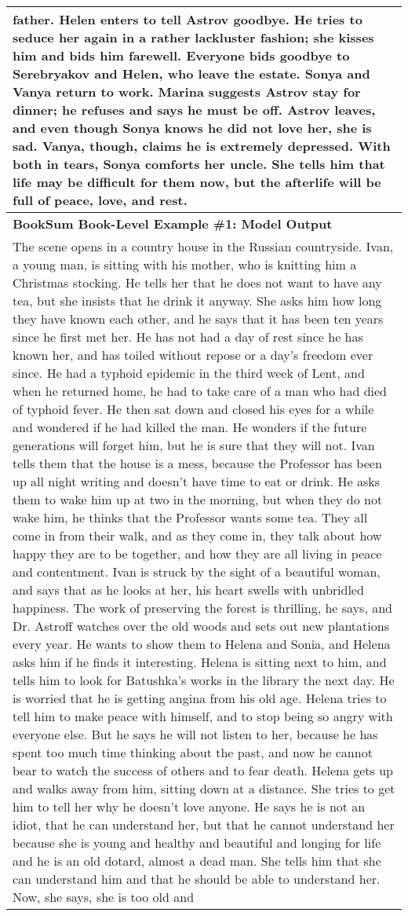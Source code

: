 \begin{table}[!htbp]
\begin{tabular}{p{\linewidth}}
father. Helen enters to tell Astrov goodbye. He tries to seduce her again in a rather lackluster fashion; she kisses him and bids him farewell. Everyone bids goodbye to Serebryakov and Helen, who leave the estate. Sonya and Vanya return to work. Marina suggests Astrov stay for dinner; he refuses and says he must be off. Astrov leaves, and even though Sonya knows he did not love her, she is sad. Vanya, though, claims he is extremely depressed. With both in tears, Sonya comforts her uncle. She tells him that life may be difficult for them now, but the afterlife will be full of peace, love, and rest.
    \\
    \midrule
    \textbf{BookSum Book-Level Example \#1: Model Output} \\
    \midrule
The scene opens in a country house in the Russian countryside. Ivan, a young man, is sitting with his mother, who is knitting him a Christmas stocking. He tells her that he does not want to have any tea, but she insists that he drink it anyway. She asks him how long they have known each other, and he says that it has been ten years since he first met her. He has not had a day of rest since he has known her, and has toiled without repose or a day's freedom ever since. He had a typhoid epidemic in the third week of Lent, and when he returned home, he had to take care of a man who had died of typhoid fever. He then sat down and closed his eyes for a while and wondered if he had killed the man. He wonders if the future generations will forget him, but he is sure that they will not. Ivan tells them that the house is a mess, because the Professor has been up all night writing and doesn't have time to eat or drink. He asks them to wake him up at two in the morning, but when they do not wake him, he thinks that the Professor wants some tea. They all come in from their walk, and as they come in, they talk about how happy they are to be together, and how they are all living in peace and contentment. Ivan is struck by the sight of a beautiful woman, and says that as he looks at her, his heart swells with unbridled happiness. The work of preserving the forest is thrilling, he says, and Dr. Astroff watches over the old woods and sets out new plantations every year. He wants to show them to Helena and Sonia, and Helena asks him if he finds it interesting. Helena is sitting next to him, and tells him to look for Batushka's works in the library the next day. He is worried that he is getting angina from his old age. Helena tries to tell him to make peace with himself, and to stop being so angry with everyone else. But he says he will not listen to her, because he has spent too much time thinking about the past, and now he cannot bear to watch the success of others and to fear death. Helena gets up and walks away from him, sitting down at a distance. She tries to get him to tell her why he doesn't love anyone. He says he is not an idiot, that he can understand her, but that he cannot understand her because she is young and healthy and beautiful and longing for life and he is an old dotard, almost a dead man. She tells him that she can understand him and that he should be able to understand her. Now, she says, she is too old and 
\end{tabular}
\end{table}
